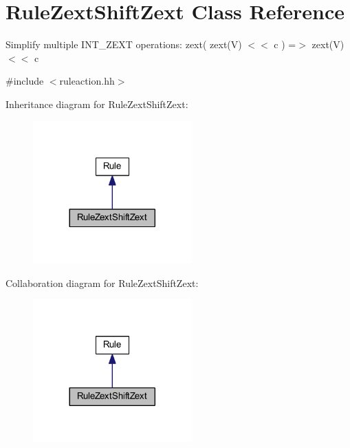 \hypertarget{class_rule_zext_shift_zext}{}\section{Rule\+Zext\+Shift\+Zext Class Reference}
\label{class_rule_zext_shift_zext}


Simplify multiple I\+N\+T\+\_\+\+Z\+E\+XT operations\+: {\ttfamily zext( zext(\+V) $<$$<$ c ) =$>$ zext(\+V) $<$$<$ c}  




{\ttfamily \#include $<$ruleaction.\+hh$>$}



Inheritance diagram for Rule\+Zext\+Shift\+Zext\+:
\nopagebreak
\begin{figure}[H]
\begin{center}
\leavevmode
\includegraphics[width=173pt]{class_rule_zext_shift_zext__inherit__graph}
\end{center}
\end{figure}


Collaboration diagram for Rule\+Zext\+Shift\+Zext\+:
\nopagebreak
\begin{figure}[H]
\begin{center}
\leavevmode
\includegraphics[width=173pt]{class_rule_zext_shift_zext__coll__graph}
\end{center}
\end{figure}
